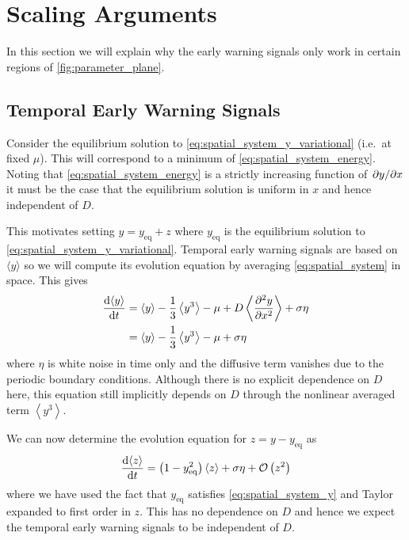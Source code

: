     \section{Scaling Arguments}
    \label{sec:scaling_arguments}
    
    In this section we will explain why the early warning signals only work in certain regions of \cref{fig:parameter_plane}.
    \subsection{Temporal Early Warning Signals}
    Consider the equilibrium solution to \cref{eq:spatial_system_y_variational} (i.e.\ at fixed $\mu$). This will correspond to a minimum
    of \cref{eq:spatial_system_energy}. Noting that \cref{eq:spatial_system_energy} is a strictly increasing function of $\pdv*{y}{x}$ it must be the case
    that the equilibrium solution is uniform in $x$ and hence independent of $D$.

    This motivates setting $y = y_{\mathrm{eq}} + z$ where $y_{\mathrm{eq}}$ is the equilibrium solution to \cref{eq:spatial_system_y_variational}. Temporal
    early warning signals are based on $\langle y \rangle$ so we will compute its evolution equation by averaging \cref{eq:spatial_system} in space.
    This gives
    \begin{align*}
      \dv{\langle y \rangle}{t} &= \langle y \rangle - \frac{1}{3} \left\langle y^3 \right\rangle - \mu + D \left\langle \pdv[2]{y}{x} \right\rangle + \sigma \eta \\
                               &= \langle y \rangle - \frac{1}{3} \left\langle y^3 \right\rangle - \mu + \sigma \eta
    \end{align*}
    where $\eta$ is white noise in time only and the diffusive term vanishes due to the periodic boundary conditions. Although there is no explicit dependence on $D$ here,
    this equation still implicitly depends on $D$ through the nonlinear averaged term $\left\langle y^3 \right\rangle$.

    We can now determine the evolution equation for $z = y - y_{\mathrm{eq}}$  as
    \begin{equation}
      \label{eq:averaged_linear_perturbation_evolution}
      \dv{\langle z\rangle}{t} = \left(1 - y_{\mathrm{eq}}^2\right)\left\langle z \right \rangle + \sigma \eta  + \mathcal{O}\left(z^2 \right)
  \end{equation}
  where we have used the fact that $y_{\mathrm{eq}}$ satisfies \cref{eq:spatial_system_y} and Taylor expanded to first order in $z$. This has no dependence on
  $D$ and hence we expect the temporal early warning signals to be independent of $D$.

